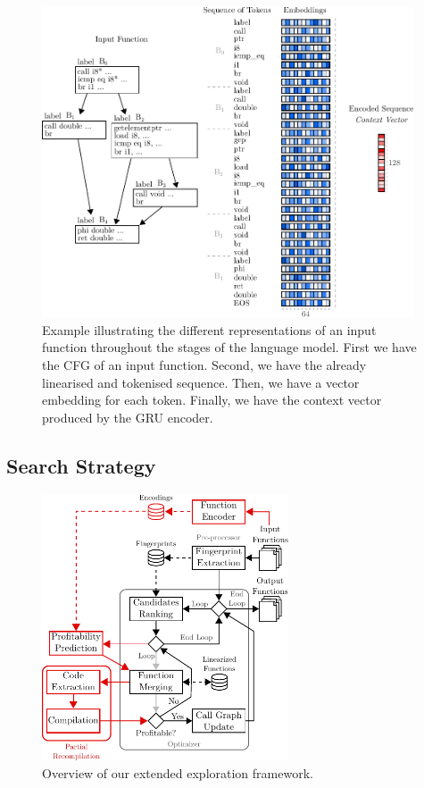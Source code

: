 \begin{figure}[h]
  \centering
  \includegraphics[width=0.98\textwidth]{src/deeplearning/figs/tokening-example.pdf}
  \caption{Example illustrating the different representations of an input function throughout the stages of the language model. First we have the CFG of an input function. Second, we have the already linearised and tokenised sequence. Then, we have a vector embedding for each token. Finally, we have the context vector produced by the GRU encoder.}
  \label{fig:tokening-example}
\end{figure}

\subsection{Search Strategy}

\begin{figure}[h]
  \centering
  \includegraphics[width=0.65\textwidth]{src/deeplearning/figs/func-merge-opt-new-arch.pdf}
  \caption{Overview of our extended exploration framework.}
  \label{fig:func-merge-opt-new-arch}
\end{figure}


